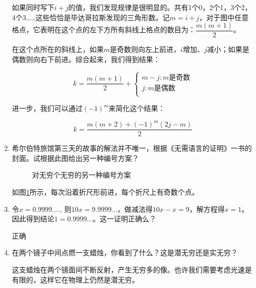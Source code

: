 \documentclass[UTF8]{article}
\begin{document}
\begin{enumerate}
如果同时写下$i+j$的值，我们发现规律是很明显的。共有1个0，2个1，3个2，4个3……这些恰恰是毕达哥拉斯发现的三角形数。记$m = i + j$，对于图中任意格点，它表明在这个点的左下方所有斜线上格点的数目为：$\dfrac{m(m + 1)}{2}$。

在这个点所在的斜线上，如果$m$是奇数则向左上前进，$i$增加、$j$减小；如果是偶数则向右下前进。综合起来，我们得到结果：

\[
k = \dfrac{m(m + 1)}{2} + \begin{cases} m - j: \text{$m$是奇数} \\
j: \text{$m$是偶数} \\
\end{cases}
\]

进一步，我们可以通过$(-1)^m$来简化这个结果：

\[
k = \dfrac{m(m + 2) + (-1)^m (2j - m)}{2}
\]

\item{希尔伯特旅馆第三天的故事的解法并不唯一，根据《无需语言的证明》一书的封面。试根据此图给出另一种编号方案？}

\begin{figure}[htbp]
\centering
{}
\caption{对无穷个无穷的另一种编号方案}
\label{fig:NNtoN2}
\end{figure}

如图\ref{fig:NNtoN2}所示，每次沿着折尺形前进，每个折尺上有奇数个点。

\item 令$x = 0.9999....$, 则$10x = 9.9999...$，做减法得$10x - x = 9$，解方程得$x = 1$。因此得到结论$1 = 0.9999...$。这一证明正确么？

正确

\item 在两个镜子中间点燃一支蜡烛，你看到了什么？这是潜无穷还是实无穷？

这支蜡烛在两个镜面间不断反射，产生无穷多的像。也许我们需要考虑光速是有限的，这样它在物理上仍然是潜无穷。

\end{enumerate}
\end{document}
